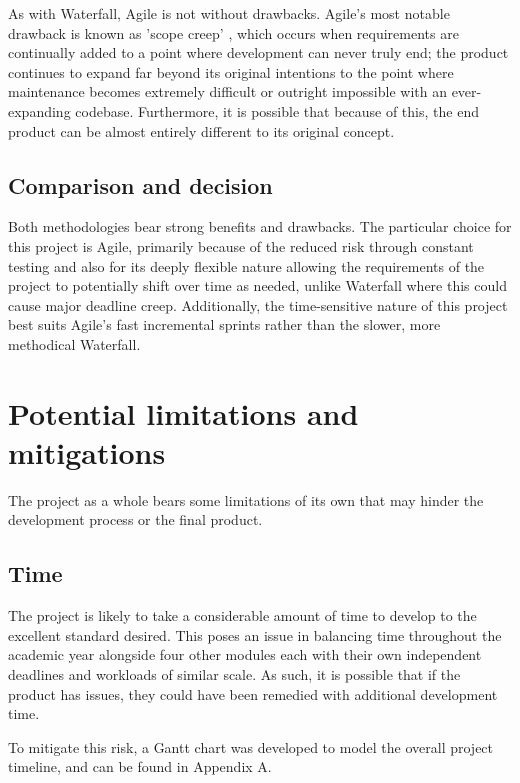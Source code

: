 \para As with Waterfall, Agile is not without drawbacks. Agile's most notable drawback is known as 'scope creep' \autocite{malsamWhatScopeCreep2024},
which occurs when requirements are continually added to a point where development can never truly end; the product continues to expand 
far beyond its original intentions to the point where maintenance becomes extremely difficult or outright impossible with an 
ever-expanding codebase. Furthermore, it is possible that because of this, the end product can be almost entirely different to its original concept.

\subsection{Comparison and decision}

Both methodologies bear strong benefits and drawbacks. The particular choice for this project is Agile, primarily because of the reduced 
risk through constant testing and also for its deeply flexible nature allowing the requirements of the project to potentially shift 
over time as needed, unlike Waterfall where this could cause major deadline creep. Additionally, the time-sensitive nature of this project 
best suits Agile's fast incremental sprints rather than the slower, more methodical Waterfall.

\section{Potential limitations and mitigations}\label{sec:Limitations}
The project as a whole bears some limitations of its own that may hinder the development process or the final product.

\subsection{Time}
The project is likely to take a considerable amount of time to develop to the excellent standard desired. This poses an issue 
in balancing time throughout the academic year alongside four other modules each with their own independent deadlines and workloads
of similar scale. As such, it is possible that if the product has issues, they could have been remedied with additional development 
time.

\para To mitigate this risk, a Gantt chart was developed to model the overall project timeline, and can be found in Appendix A.

